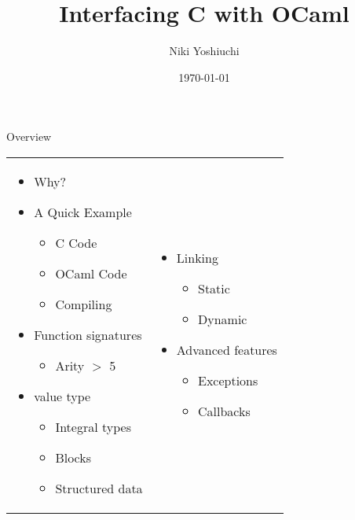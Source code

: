\documentclass{beamer}
\title{Interfacing C with OCaml}
\author{Niki Yoshiuchi}
\date{\today}
\begin{document}
\begin{frame}[plain]
    \titlepage
\end{frame}

\begin{frame}{Overview}
\begin{tabular}{p{}p{}}
\begin{itemize}
    \item Why?
    \item A Quick Example
    \begin{itemize}
        \item C Code
        \item OCaml Code
        \item Compiling
    \end{itemize}
    \item Function signatures
    \begin{itemize}
        \item Arity $>$ 5
    \end{itemize}
    \item value type
    \begin{itemize}
        \item Integral types
        \item Blocks
        \item Structured data
    \end{itemize}
\end{itemize} &

\begin{itemize}
    \item Linking
    \begin{itemize}
        \item Static
        \item Dynamic
    \end{itemize}
    \item Advanced features
    \begin{itemize}
        \item Exceptions
        \item Callbacks
    \end{itemize}
\end{itemize} \\
\end{tabular}
\end{frame}
\end{document}
